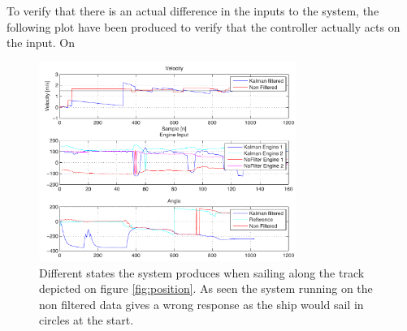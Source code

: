 \documentclass{ifacconf}
\begin{document}
To verify that there is an actual difference in the inputs to the system, the following plot have been produced to verify that the controller actually acts on the input. On 
\begin{figure}
	\begin{center}
		\includegraphics[width=8.4cm]{img/states}    %
		\caption{Different states the system produces when sailing along the track depicted on figure \ref{fig:position}. As seen the system running on the non filtered data gives a wrong response as the ship would sail in circles at the start.}  %
		\label{fig:states}               
	\end{center}                                 %
\end{figure}
\end{document}
